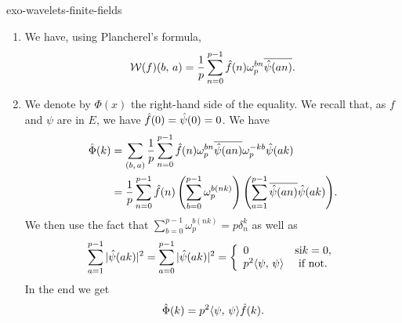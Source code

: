  
\begin{correction}{exo-wavelets-finite-fields}
\begin{enumerate}
\item We have, using Plancherel's formula,
\begin{equation*}
\mathcal{W} (f) (b, \, a) = \frac{1}{p} \sum_{n = 0}^{p-1}{\hat{f} (n) \omega_p^{bn} \overline{\hat{\psi} (an)}}.
\end{equation*}
 
\item We denote by $ \Phi (x) $ the right-hand side of the equality. We recall that, as $ f $ and $ \psi $ are in $ E $, we have $ \hat{f} (0) = \hat{\psi} (0) = 0 $. We have
\begin{align*}
\hat{\Phi} (k) & = \sum_{(b, \, a)}{\frac{1}{p} \sum_{n = 0}^{p-1}{\hat{f} (n) \omega_p^{bn} \overline{\hat{\psi} (an)}} \omega_p^{- kb} \hat{\psi} (ak)} \\
& = \frac{1}{p} \sum_{n = 0}^{p-1}{\hat{f} (n) \left(\sum_{b = 0}^{p-1}{\omega_p^{b (nk)}} \right) \left(\sum_{a = 1}^{p-1}{\overline{\hat{\psi} (an)} \hat{\psi} (ak )} \right)}.
\end{align*}
We then use the fact that $ \sum_{b = 0}^{p-1}{\omega_p^{b (nk)}} = p \delta_n^k $ as well as
\begin{equation*}
\sum_{a = 1}^{p-1}{| \hat{\psi} (ak) |^2} = \sum_{a = 0}^{p-1}{| \hat{\psi} (ak) |^2} = \left\{\begin{array}{ll} 0 & \text{si} k = 0, \\p^2 \langle \psi,\,\psi\rangle & \text{ if not}. \end{array} \right.
\end{equation*}
In the end we get
\begin{equation*}
\hat{\Phi} (k) = p^2 \langle \psi,\,\psi\rangle \hat{f} (k).
\end{equation*}
 

\end{enumerate}
\end{correction}
